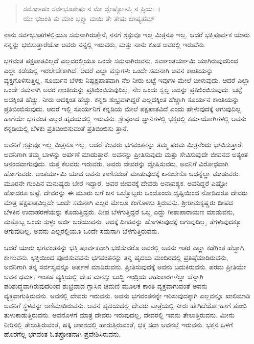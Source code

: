 \begin{verse}
ಸಮೋಽಹಂ ಸರ್ವಭೂತೇಷು ನ ಮೇ ದ್ವೇಷ್ಯೋಽಸ್ತಿ ನ ಪ್ರಿಯಃ~।\\ಯೇ ಭಜಂತಿ ತು ಮಾಂ ಭಕ್ತ್ಯಾ ಮಯಿ ತೇ ತೇಷು ಚಾಪ್ಯಹಮ್ 
\end{verse}

{\small ನಾನು ಸರ್ವಭೂತಗಳಲ್ಲಿಯೂ ಸಮನಾಗಿರುತ್ತೇನೆ, ನನಗೆ ಶತ್ರುವೂ ಇಲ್ಲ ಮಿತ್ರನೂ ಇಲ್ಲ. ಆದರೆ ಭಕ್ತಿಪೂರ್ವಕ ಯಾರು ನನ್ನನ್ನು ಭಜಿಸುತ್ತಾರೆಯೋ ಅವರು ನನ್ನಲ್ಲಿ ಇರುವರು, ಮತ್ತು ನಾನು ಕೂಡ ಅವರಲ್ಲಿ ಇರುವೆನು.}

ಭಗವಂತ ಪಕ್ಷಪಾತವಿಲ್ಲದೆ ಎಲ್ಲದರಲ್ಲಿಯೂ ಒಂದೇ ಸಮನಾಗಿರುವನು. ಸರ್ವಾಂತರ್ಯಾಮಿ ಯಾಗಿರುವುದರಿಂದ ಎಲ್ಲಾ ಕಡೆಯಲ್ಲಿ ಇರಲೇಬೇಕಾಗಿದೆ. ಆದರೆ ಎಲ್ಲಾ ವಸ್ತುಗಳು ಒಂದೇ ಸಮನಾಗಿ ಅವನ ಕಾಂತಿಯನ್ನು ವ್ಯಕ್ತಗೊಳಿಸುತ್ತಿಲ್ಲ. ಸೂರ್ಯನ ಬೆಳಕು ನಿಷ್ಪಕ್ಷಪಾತವಾಗಿ ನೆಲ ನೀರು ಬಟ್ಟೆ ಇವುಗಳ ಮೇಲೆ ಬೀಳುವುದು. ಆದರೆ ಎಲ್ಲಾ ಒಂದೇ ಸಮನಾಗಿ ಅದರ ಕಾಂತಿಯನ್ನು ಪ್ರತಿಬಿಂಬಿಸುವುದಿಲ್ಲ. ನೆಲ ಒಂದು ಸ್ವಲ್ಪ ಅದನ್ನು ಪ್ರತಿಬಿಂಬಿಸುವುದು. ಬಟ್ಟೆ ಅದಕ್ಕಿಂತ ಹೆಚ್ಚು. ನೀರು ಅದಕ್ಕಿಂತ ಹೆಚ್ಚು. ಕನ್ನಡಿ ಶುಭ್ರವಾಗಿದ್ದರೆ ಎಲ್ಲದಕ್ಕಿಂತ ಹೆಚ್ಚಾಗಿ ಸೂರ್ಯನ ಕಾಂತಿಯನ್ನು ಪ್ರತಿಬಿಂಬಿಸುವುದು. ಆದರೆ ಇಲ್ಲಿ ಸೂರ್ಯನಿಗೆ ಕನ್ನಡಿಯ ಮೇಲೆ ಪಕ್ಷಪಾತವಿದೆ ಎಂದು ಹೇಳುವುದಕ್ಕೆ ಆಗುವುದಿಲ್ಲ. ಹಾಗೆಯೇ ಭಗವಂತ ಎಲ್ಲರ ಹೃದಯದಲ್ಲಿ ಇರುವನು. ಶ್ರೇಷ್ಠರಾದ ಜ್ಞಾನಿಗಳಲ್ಲಿ ಭಕ್ತರಲ್ಲಿ ಕರ್ಮಯೋಗಿಗಳಲ್ಲಿ ಅವನು ಕನ್ನಡಿಯಲ್ಲಿ ಬೆಳಕು ಪ್ರತಿಬಿಂಬಿಸುವಂತೆ ಪ್ರತಿಬಿಂಬಿಸು ತ್ತಾನೆ.

ಅವನಿಗೆ ಶತ್ರುವೂ ಇಲ್ಲ ಮಿತ್ರನೂ ಇಲ್ಲ. ಆದರೆ ಕೆಲವರು ಭಗವಂತನನ್ನು ತಮ್ಮ ಪರಮ ಮಿತ್ರನೆಂದು ಭಾವಿಸುತ್ತಾರೆ. ಅವನಿಗಾಗಿ ತಮ್ಮ ಬಾಳನ್ನು ಅರ್ಪಣೆ ಮಾಡುತ್ತಾರೆ. ಅವನನ್ನು ಪ್ರೀತಿಸುವುದು ಮತ್ತು ಸೇವಿಸುವುದೇ ಜೀವನದ ಅತ್ಯಂತ ಆನಂದವಾಗುವುದು. ಮತ್ತೆ ಕೆಲವರು ಇರುವರು. ಅವರು ದೇವರನ್ನು ದ್ವೇಷಿಸುವರು. ಅವನಿಗೆ ವಿರೋಧವಾಗಿ ಹೋಗುವರು. ಅಂತರ್ಯಾಮಿ ಯಾದ ಅವನು ಕಾಣಿಸದಂತೆ ಮಾಡುವುದಕ್ಕೆ ಏನುಬೇಕೊ ಅದನ್ನೆಲ್ಲಾ ಮಾಡುವರು. ಮೂರನೇ ಗುಂಪಿನ ಮನುಷ್ಯರು ಬೇರೆ ಇದ್ದಾರೆ. ಅವರ ಜೀವನಕ್ಕೆ ದೇವರು ಅನಾವಶ್ಯಕ. ಅವನಿದ್ದರೆ ಎಷ್ಟೋ ಹೋದರೂ ಅಷ್ಟೆ. ದೇವರನ್ನು ಈ ಮೂರು ಬಗೆ ಜನ ಒಬ್ಬೊಬ್ಬರು ಒಂದೊಂದು ದೃಷ್ಟಿಯಿಂದ ನೋಡಿದರೂ ದೇವರು ಮಾತ್ರ ಪಕ್ಷಪಾತವಿಲ್ಲದೇ ಒಂದೇ ಸಮನಾಗಿ ಎಲ್ಲರ ಮೇಲೂ ಕಂಗೊಳಿಸು ತ್ತಿರುವನು. ಶ‍್ರೀರಾಮಕೃಷ್ಣರು ದೀಪದ ಬೆಳಕಿನ ಉದಾಹರಣೆಯನ್ನು ಕೊಡುತ್ತಿದ್ದರು. ದೀಪ ಬೆಳಗುತ್ತಿದ್ದರೆ ಒಬ್ಬ ಎದ್ದು ಗೀತಾಪಾರಾಯಣ ಮಾಡುವನು, ಮತ್ತೊಬ್ಬ ಒಂದು ಸುಳ್ಳು ಅರ್ಜಿ ಬರೆಯುವನು. ಅದಕ್ಕೆ ದೀಪವನ್ನು ಹೊಗಳುವುದಕ್ಕೆ ಆಗುವುದಿಲ್ಲ, ತೆಗಳುವುದಕ್ಕೂ ಆಗುವುದಿಲ್ಲ. ಅವನು ಎಲ್ಲರಲ್ಲಿಯೂ ಒಂದೇ ಸಮನಾಗಿ ಬೆಳಗುತ್ತಿರುವನು.

ಆದರೆ ಯಾರು ಭಗವಂತನನ್ನು ಭಕ್ತಿ ಪೂರ್ವಕವಾಗಿ ಭಜಿಸುವರೊ ಅವರಲ್ಲಿ ಅವನು ಇತರ ಎಲ್ಲಾ ಕಡೆಗಿಂತ ಹೆಚ್ಚಾಗಿ ಕಾಣುವನು. ಭಕ್ತಿಯಿಂದ ಪೂಜಿಸುವವನು ಭಗವಂತನನ್ನು ತನ್ನ ಹೃದಯ ಮಂದಿರದಲ್ಲಿ ಪ್ರತಿಷ್ಠೆಮಾಡಿರುವನು, ಅವನಿಗಾಗಿ ತನ್ನ ಸರ್ವಸ್ವವನ್ನೂ ಅರ್ಪಣೆ ಮಾಡಿರುವನು. ಪ್ರೀತಿಸುವುದಕ್ಕೆ ಅವನು ಬದುಕಿರುವನು. ಪರಮ ಪ್ರೀತಿಯೇ ಅವನ ಧರ್ಮ. ಇಂತಹ ವ್ಯಕ್ತಿಯಲ್ಲಿ ದೇಹ ಮನಸ್ಸು ಬುದ್ಧಿ ಇಂದ್ರಿಯ ಅಹಂಕಾರಗಳೆಲ್ಲಾ ಚೆನ್ನಾಗಿ ಪರಿಶುದ್ಧವಾಗಿರುವುದರಿಂದ ಶುಭ್ರವಾದ ಗ್ಲಾಸಿನ ಚಿಮಣಿ ಮೂಲಕ ಕಾಂತಿ ವ್ಯಕ್ತವಾಗುವಂತೆ ಅವನು ವ್ಯಕ್ತವಾಗುತ್ತಿರುವನು. ಅವನಲ್ಲಿ ದೇವರು ಇರುವನು. ಅವನು ಭಗವಂತನನ್ನೇ ಇರಿಸುವುದಕ್ಕಾಗಿ ಎಲ್ಲವನ್ನೂ ಖಾಲಿಮಾಡಿ ಅವನಿಗೆ ಸ್ಥಳವನ್ನು ಅಣಿಮಾಡಿರುವನು. ಅವನ ಹೃದಯದಲ್ಲಿ ದೇವರು ಪಾತ್ರೆಯಲ್ಲಿ ನೀರು ಹೇಗಿದೆಯೋ ಹಾಗೆ ತುಂಬಿ ತುಳುಕಾಡುತ್ತಿರುವನು. ಅವನೊಳಗೆ ಮಾತ್ರ ದೇವರು ಇರುವುದಲ್ಲ, ದೇವರಲ್ಲಿ ಇವನು ತೇಲುತ್ತಿರುವನು. ಮೀನು ನೀರಿನಲ್ಲಿ ತೇಲುತ್ತಿರುವಂತೆ, ಹಕ್ಕಿ ಆಕಾಶದಲ್ಲಿ ಹಾರುತ್ತಿರುವಂತೆ, ಭಕ್ತ ಸದಾ ಅವನಲ್ಲೆ ಇರುವನು. ಭಕ್ತನ ಒಳಗೆ ಹೊರಗೆಲ್ಲ ಭಗವಂತ ಓತಪ್ರೋತನಾಗಿ ಪ್ರವೇಶಿಸಿರುವನು.

